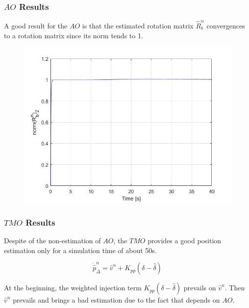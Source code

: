 \documentclass{beamer}
\begin{document}
	\begin{frame}
		\frametitle{$AO$ Results}
		A good result for the $AO$ is that the estimated rotation matrix $\hat{R}^n_b$ convergences to a rotation matrix since its norm tends to 1.
		\begin{figure}[H]
			\includegraphics[scale=0.3]{norm_rot}
		\end{figure}
		
	\end{frame}


    \begin{frame}
		\frametitle{$TMO$ Results}
		Despite of the non-estimation of $AO$,
		the $TMO$ provides a good position estimation
		only for a
		simulation time of about 50s.
		
		\[ \dot{\hat{p}}^n_\Delta = \hat{v}^n + K_{pp}(\delta - \hat{\delta})  \]
		
		
		At the beginning, the weighted injection term 
		$K_{pp}(\delta - \hat{\delta})$ prevails on 
		$\hat{v}^n$. Then $\hat{v}^n$ prevails and brings
		a bad estimation due to the fact that depends on
		$AO$.
		
	\end{frame}
\end{document}

